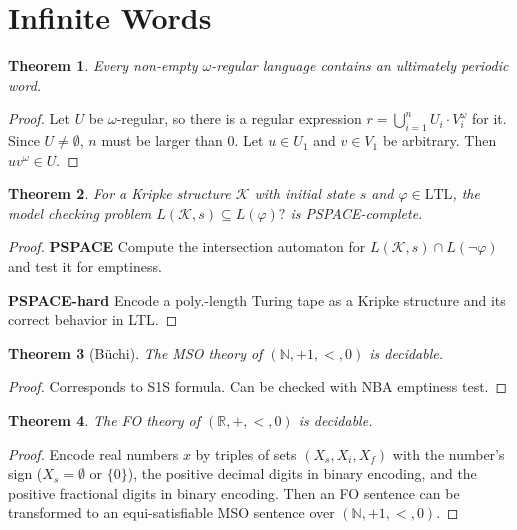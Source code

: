\documentclass{article}
\newtheorem{theorem}{Theorem}[section]
\begin{document}
\section{Infinite Words}

\begin{theorem}
	Every non-empty $\omega$-regular language contains an ultimately periodic word.
\end{theorem}
\begin{proof}
	Let $U$ be $\omega$-regular, so there is a regular expression $r = \bigcup_{i=1}^n U_i \cdot V_i^\omega$ for it. Since $U \neq \emptyset$, $n$ must be larger than 0. Let $u \in U_1$ and $v \in V_1$ be arbitrary. Then $u v^\omega \in U$.
\end{proof}


\begin{theorem}
	For a Kripke structure $\mathcal{K}$ with initial state $s$ and $\varphi \in \text{LTL}$, the model checking problem $L(\mathcal{K}, s) \subseteq L(\varphi)?$ is PSPACE-complete.
\end{theorem}
\begin{proof}
	\textbf{PSPACE} Compute the intersection automaton for $L(\mathcal{K}, s) \cap L(\neg \varphi)$ and test it for emptiness.
	
	\textbf{PSPACE-hard} Encode a poly.-length Turing tape as a Kripke structure and its correct behavior in LTL.
\end{proof}

\begin{theorem}[Büchi]
	The MSO theory of $(\mathbb{N}, +1, <, 0)$ is decidable.
\end{theorem}
\begin{proof}
	Corresponds to S1S formula. Can be checked with NBA emptiness test.
\end{proof}

\begin{theorem}
	The FO theory of $(\mathbb{R}, +, <, 0)$ is decidable.
\end{theorem}
\begin{proof}
	Encode real numbers $x$ by triples of sets $(X_s, X_i, X_f)$ with the number's sign ($X_s = \emptyset$ or $\{0\}$), the positive decimal digits in binary encoding, and the positive fractional digits in binary encoding. Then an FO sentence can be transformed to an equi-satisfiable MSO sentence over $(\mathbb{N}, +1, <, 0)$.
\end{proof}
\end{document}
